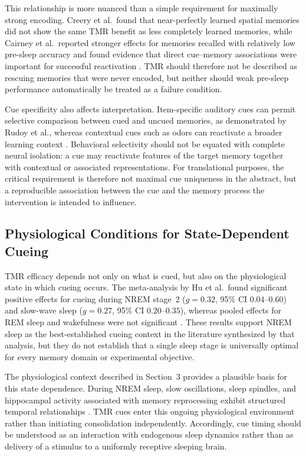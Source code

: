 This relationship is more nuanced than a simple requirement for maximally strong
encoding. Creery et al.\ found that near-perfectly learned spatial memories did
not show the same TMR benefit as less completely learned memories, while Cairney
et al.\ reported stronger effects for memories recalled with relatively low
pre-sleep accuracy and found evidence that direct cue--memory associations were
important for successful reactivation
\citep{creery2015priorlearning,cairney2016benefits}. TMR should therefore not
be described as rescuing memories that were never encoded, but neither should
weak pre-sleep performance automatically be treated as a failure condition.

Cue specificity also affects interpretation. Item-specific auditory cues can
permit selective comparison between cued and uncued memories, as demonstrated
by Rudoy et al., whereas contextual cues such as odors can reactivate a broader
learning context \citep{rasch2007odor,rudoy2009strengthening}. Behavioral
selectivity should not be equated with complete neural isolation: a cue may
reactivate features of the target memory together with contextual or associated
representations. For translational purposes, the critical requirement is
therefore not maximal cue uniqueness in the abstract, but a reproducible
association between the cue and the memory process the intervention is intended
to influence.


\subsection{Physiological Conditions for State-Dependent Cueing}

TMR efficacy depends not only on what is cued, but also on the physiological
state in which cueing occurs. The meta-analysis by Hu et al.\ found significant
positive effects for cueing during NREM stage~2
(\(g=0.32\), 95\% CI \(0.04\)--\(0.60\)) and slow-wave sleep
(\(g=0.27\), 95\% CI \(0.20\)--\(0.35\)), whereas pooled effects for REM sleep
and wakefulness were not significant
\citep{hu2020promoting}. These results support NREM sleep as the best-established
cueing context in the literature synthesized by that analysis, but they do not
establish that a single sleep stage is universally optimal for every memory
domain or experimental objective.

The physiological context described in Section~3 provides a plausible basis for
this state dependence. During NREM sleep, slow oscillations, sleep spindles, and
hippocampal activity associated with memory reprocessing exhibit structured
temporal relationships
\citep{rasch2013sleep,klinzing2019mechanisms,staresina2015nesting}. TMR cues
enter this ongoing physiological environment rather than initiating
consolidation independently. Accordingly, cue timing should be understood as an
interaction with endogenous sleep dynamics rather than as delivery of a stimulus
to a uniformly receptive sleeping brain.

